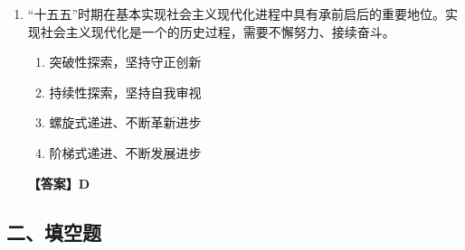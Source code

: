 \documentclass[UTF8,11pt,a4paper]{ctexart}
\begin{document}
\begin{enumerate}[label=\textbf{\arabic*.}, leftmargin=2.5em, itemsep=0.7em]
\begin{enumerate}[label=\Alph*., leftmargin=2em, itemsep=0.1em, topsep=0.15em]
\item 弘扬伟大长征精神 同心共筑强大国防
\item 弘扬抗战精神 共筑国防长城
\item 依法开展国防教育 提升全民国防素养
\item 踔厉奋发强国防 勇毅前行向复兴
\end{enumerate}
\textbf{【答案】A}
\item “十五五”时期在基本实现社会主义现代化进程中具有承前启后的重要地位。实现社会主义现代化是一个\allowbreak\underline{\hspace{4em}}的历史过程，需要不懈努力、接续奋斗。
\begin{enumerate}[label=\Alph*., leftmargin=2em, itemsep=0.1em, topsep=0.15em]
\item 突破性探索，坚持守正创新
\item 持续性探索，坚持自我审视
\item 螺旋式递进、不断革新进步
\item 阶梯式递进、不断发展进步
\end{enumerate}
\textbf{【答案】D}
\end{enumerate}

\subsection*{二、填空题}
\end{document}
